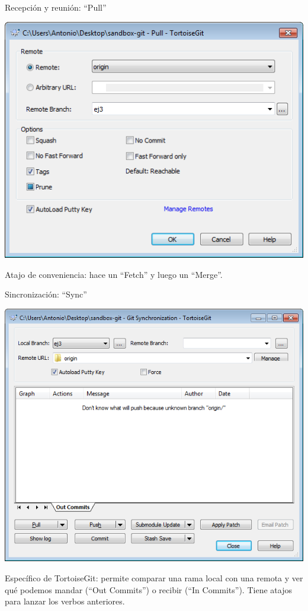 \documentclass[xcolor=svgnames]{beamer}
\begin{document}
\begin{frame}{Recepción y reunión: ``Pull''}
  \begin{center}
    \includegraphics[width=\textwidth,height=.65\textheight,keepaspectratio]{tomas/pull}
  \end{center}
  
  Atajo de conveniencia: hace un ``Fetch'' y luego un ``Merge''.
\end{frame}

\begin{frame}{Sincronización: ``Sync''}
  \begin{center}
    \includegraphics[width=\textwidth,height=.65\textheight,keepaspectratio]{tomas/sync}
  \end{center}
  
  Específico de TortoiseGit: permite comparar una rama local con una
  remota y ver qué podemos mandar (``Out Commits'') o recibir (``In
  Commits''). Tiene atajos para lanzar los verbos anteriores.
\end{frame}
\end{document}
